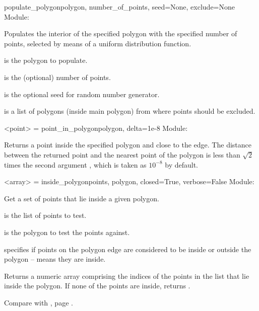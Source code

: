 \documentclass{manual}
\begin{document}
\label{ref:function_populate_polygon}
\begin{funcdesc}{populate_polygon}{polygon, number_of_points, seed=None, exclude=None}
Module: 

Populates the interior of the specified polygon with the specified number of points,
selected by means of a uniform distribution function.

 is the polygon to populate.

 is the (optional) number of points.

is the optional seed for random number generator.

 is a list of polygons (inside main polygon) from where points should be excluded.
\end{funcdesc}

\label{ref:function_point_in_polygon}
\begin{funcdesc}{<point> = point_in_polygon}{polygon, delta=1e-8}
Module: 

Returns a point inside the specified polygon and close to the edge. The distance between
the returned point and the nearest point of the polygon is less than $\sqrt{2}$ times the
second argument , which is taken as $10^{-8}$ by default.
\end{funcdesc}

\label{ref:function_inside_polygon}
\begin{funcdesc}{<array> = inside_polygon}{points, polygon, closed=True, verbose=False}
Module: 

Get a set of points that lie inside a given polygon.

 is the list of points to test.

 is the polygon to test the points against.

 specifies if points on the polygon edge are considered to be inside
or outside the polygon --  means they are inside.

Returns a numeric array comprising the indices of the points in the list
that lie inside the polygon.  If none of the points are inside, returns
.

Compare with , page \pageref{ref:function_outside_polygon}.
\end{funcdesc}
\end{document}
